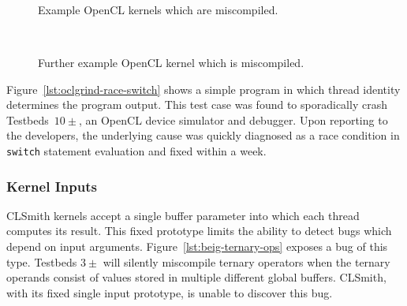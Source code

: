 \begin{figure}
  \centering %
  \\%
  \\%
  \\%
  \caption[Example kernels which are miscompiled]{%
    Example OpenCL kernels which are miscompiled.%
  }%
\end{figure}

\begin{figure}
  \centering %
  \\%
  \caption[Further example kernel which is miscompiled]{%
    Further example OpenCL kernel which is miscompiled.%
  }%
\end{figure}

Figure~\ref{lst:oclgrind-race-switch} shows a simple program in which thread identity determines the program output. This test case was found to sporadically crash Testbeds~$10\pm$, an OpenCL device simulator and debugger. Upon reporting to the developers, the underlying cause was quickly diagnosed as a race condition in \texttt{switch} statement evaluation and fixed within a week.


\subsubsection{Kernel Inputs}

CLSmith kernels accept a single buffer parameter into which each thread computes its result. This fixed prototype limits the ability to detect bugs which depend on input arguments. Figure~\ref{lst:beig-ternary-ops} exposes a bug of this type. Testbeds $3\pm$ will silently miscompile ternary operators when the ternary operands consist of values stored in multiple different global buffers. CLSmith, with its fixed single input prototype, is unable to discover this bug.


